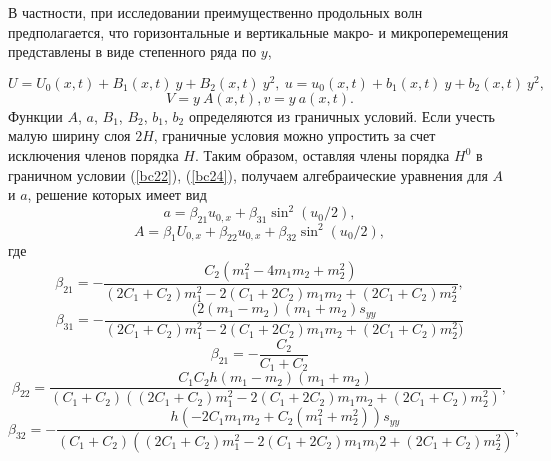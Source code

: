В частности, при исследовании преимущественно продольных волн предполагается, что горизонтальные и вертикальные макро- и микроперемещения представлены в виде степенного ряда по $y$,

\begin{equation}
	U=U_0(x,t)+B_1(x,t)~y+B_2(x,t)~y^2,~u=u_0(x,t)+b_1(x,t)~y+b_2(x,t)~y^2, \label{Usol}
\end{equation}
\begin{equation}
	V=y~A(x,t), v=y~a(x,t). \label{Vsol}
\end{equation}
Функции $A$, $a$, $B_1$, $B_2$, $b_1$, $b_2$ определяются из граничных условий. Если учесть малую ширину слоя $2H$, граничные условия можно упростить за счет исключения членов порядка $H$. Таким образом, оставляя члены порядка $H^0 $ в граничном условии (\ref{bc22}), (\ref {bc24}), получаем алгебраические уравнения для $A$ и $a$, решение которых имеет вид
\[
a=\beta_{21} u_{0,x}+\beta_{31} \sin^2(u_0/2),
\]
\[
A=\beta_{1} U_{0,x}+\beta_{22} u_{0,x}+\beta_{32}\sin^2(u_0/2),
\]
где
\[ 
\beta_{21}=-\frac{C_2 (m_1^2 - 4 m_1 m_2 + m_2^2)}{(2 C_1 + C_2) m_1^2 - 
	2 (C_1 + 2 C_2) m_1 m_2 + (2 C_1 + C_2) m_2^2},
\]
\[
\beta_{31}=-\frac{(2 (m_1 - m_2) (m_1 + m_2) s_{yy}}{(2 C_1 + C_2) m_1^2 - 
	2 (C_1 + 2 C_2) m_1 m_2 + (2 C_1 + C_2) m_2^2)}
\]
\[
\beta_{21}=-\frac{C_2}{C_1+C_2}
\]
\[ 
\beta_{22}=\frac{C_1 C_2 h (m_1 - m_2) (m_1 + m_2)}{(C_1 + C_2) ((2 C_1 + C_2) m_1^2 - 
	2 (C_1 + 2 C_2) m_1 m_2 + (2 C_1 + C_2) m_2^2)}, 
\]
\[
\beta_{32}=-\frac{h (-2 C_1 m_1 m_2 + C_2 (m_1^2 + m_2^2)) s_{yy}}{(C_1 + 
	C_2) ((2 C_1 + C_2) m_1^2 - 2 (C_1 + 2 C_2) m_1 m_)2 + (2 C_1 + C_2) m_2^2)},
\]



